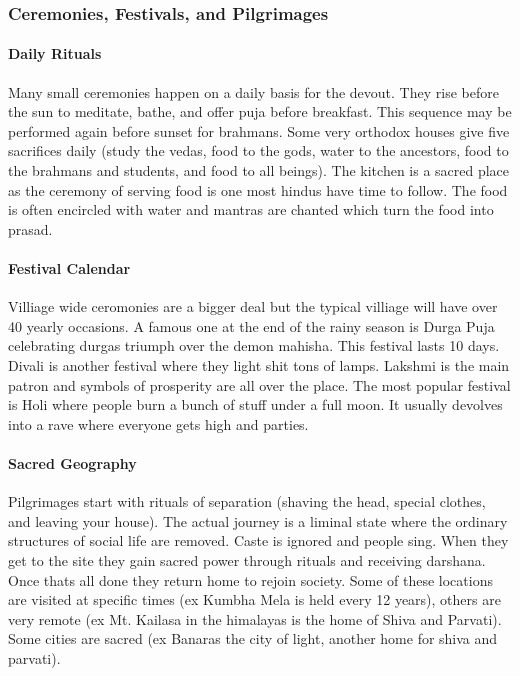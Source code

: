 \documentclass{article}
\begin{document}
\subsubsection*{Ceremonies, Festivals, and Pilgrimages}
\label{ssub:ceremonies_festivals_and_pilgrimages}
\paragraph{Daily Rituals}
\label{par:daily_rituals}
Many small ceremonies happen on a daily basis for the devout. They rise before the sun to meditate, bathe, and offer puja before breakfast. This sequence may be performed again before sunset for brahmans. Some very orthodox houses give five sacrifices daily (study the vedas, food to the gods, water to the ancestors, food to the brahmans and students, and food to all beings). The kitchen is a sacred place as the ceremony of serving food is one most hindus have time to follow. The food is often encircled with water and mantras are chanted which turn the food into prasad.

\paragraph{Festival Calendar}
\label{par:festival_calendar}
Villiage wide ceromonies are a bigger deal but the typical villiage will have over 40 yearly occasions. A famous one at the end of the rainy season is Durga Puja celebrating durgas triumph over the demon mahisha. This festival lasts 10 days. Divali is another festival where they light shit tons of lamps. Lakshmi is the main patron and symbols of prosperity are all over the place. The most popular festival is Holi where people burn a bunch of stuff under a full moon. It usually devolves into a rave where everyone gets high and parties.

\paragraph{Sacred Geography}
\label{par:sacred_geography}
Pilgrimages start with rituals of separation (shaving the head, special clothes, and leaving your house). The actual journey is a liminal state where the ordinary structures of social life are removed. Caste is ignored and people sing. When they get to the site they gain sacred power through rituals and receiving darshana. Once thats all done they return home to rejoin society. Some of these locations are visited at specific times (ex Kumbha Mela is held every 12 years), others are very remote (ex Mt. Kailasa in the himalayas is the home of Shiva and Parvati). Some cities are sacred (ex Banaras the city of light, another home for shiva and parvati).
\end{document}
